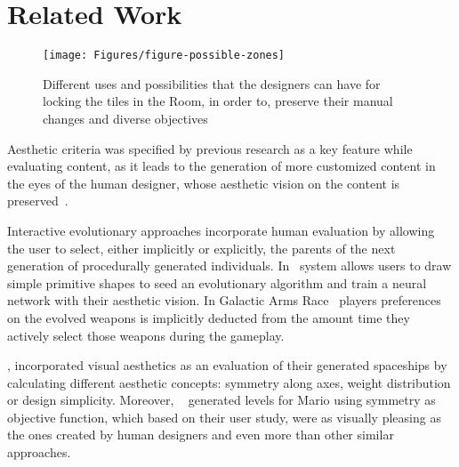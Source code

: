 \section{Related Work} \label{p2background}

\begin{figure}
\texttt{[image: Figures/figure-possible-zones]}
\caption{Different uses and possibilities that the designers can have for locking the tiles in the Room, in order to, preserve their manual changes and diverse objectives}
\label{p2fig:possible-zones}
\end{figure}


Aesthetic criteria was specified by previous research as a key feature while evaluating content, as it leads to the generation of more customized content in the eyes of the human designer, whose aesthetic vision on the content is preserved~\cite{Liapis2012AdaptingCreation,Hastings2009GalacticGame,Machwe2006IntegratingInvestigation}.



Interactive evolutionary approaches incorporate human evaluation by allowing the user to select, either implicitly or explicitly, the parents of the next generation of procedurally generated individuals. In~\citet{Zhang2015DrawCompileEvolve:Creations} system allows users to draw simple primitive shapes to seed an evolutionary algorithm and train a neural network with their aesthetic vision. In Galactic Arms Race~\cite{Hastings2009GalacticGame} players preferences on the evolved weapons is implicitly deducted from the amount time they actively select those weapons during the gameplay.

\citet{Liapis2012AdaptingCreation}, incorporated visual aesthetics as an evaluation of their generated spaceships by calculating different aesthetic concepts: symmetry along axes, weight distribution or design simplicity. Moreover, ~\citet{Mario2016ACM} generated levels for Mario using symmetry as objective function, which based on their user study, were as visually pleasing as the ones created by human designers and even more than other similar approaches. 

